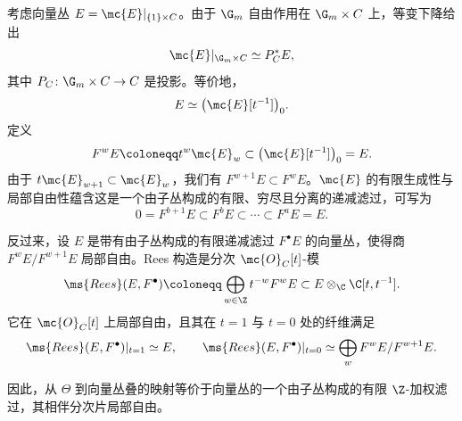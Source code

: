 \begin{rmk}
    考虑向量丛 \(E=\mc{E}|_{\{1\}\times C}\)。由于 \(\G_m\) 自由作用在 \(\G_m\times C\) 上，等变下降给出
    \[
        \mc{E}|_{\G_m\times C}\simeq P_C^*E,
    \]
    其中 \(P_C\colon\G_m\times C\to C\) 是投影。等价地，
    \[
        E\simeq\big(\mc{E}[t^{-1}]\big)_0.
    \]
    定义
    \[
        F^wE\coloneqq t^w\mc{E}_w\subset\big(\mc{E}[t^{-1}]\big)_0=E.
    \]
    由于 \(t\mc{E}_{w+1}\subset\mc{E}_w\)，我们有 \(F^{w+1}E\subset F^wE\)。\(\mc{E}\) 的有限生成性与局部自由性蕴含这是一个由子丛构成的有限、穷尽且分离的递减滤过，可写为
    \[
        0=F^{b+1}E\subset F^bE\subset\cdots\subset F^aE=E.
    \]

    反过来，设 \(E\) 是带有由子丛构成的有限递减滤过 \(F^\bullet E\) 的向量丛，使得商 \(F^wE/F^{w+1}E\) 局部自由。Rees 构造是分次 \(\mc{O}_C[t]\)-模
    \[
        \ms{Rees}(E,F^\bullet)
        \coloneqq
        \bigoplus_{w\in\Z}t^{-w}F^wE
        \subset
        E\otimes_{\C}\C[t,t^{-1}].
    \]
    它在 \(\mc{O}_C[t]\) 上局部自由，且其在 \(t=1\) 与 \(t=0\) 处的纤维满足
    \[
        \ms{Rees}(E,F^\bullet)|_{t=1}\simeq E,
        \qquad
        \ms{Rees}(E,F^\bullet)|_{t=0}
        \simeq
        \bigoplus_w F^wE/F^{w+1}E.
    \]
\end{rmk}

因此，从 \(\Theta\) 到向量丛叠的映射等价于向量丛的一个由子丛构成的有限 \(\Z\)-加权滤过，其相伴分次片局部自由。
